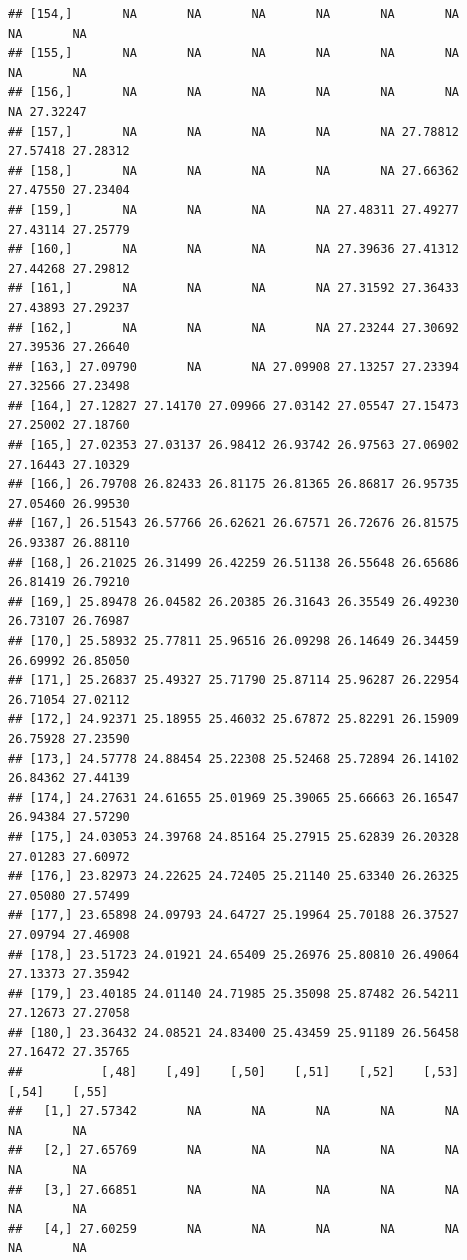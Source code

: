 \documentclass{article}\usepackage[]{graphicx}\usepackage[]{color}
\makeatletter
\newenvironment{kframe}{%
 \def\at@end@of@kframe{}%
 \ifinner\ifhmode%
  \def\at@end@of@kframe{\end{minipage}}%
  \begin{minipage}{\columnwidth}%
 \fi\fi%
 \def\FrameCommand##1{\hskip\@totalleftmargin \hskip-\fboxsep
 \colorbox{shadecolor}{##1}\hskip-\fboxsep
     \hskip-\linewidth \hskip-\@totalleftmargin \hskip\columnwidth}%
 \MakeFramed {\advance\hsize-\width
   \@totalleftmargin\z@ \linewidth\hsize
   \@setminipage}}%
 {\par\unskip\endMakeFramed%
 \at@end@of@kframe}
\newenvironment{knitrout}{}{} %
\makeatother
\begin{document}
\begin{knitrout}
\begin{kframe}
\begin{verbatim}
## [154,]       NA       NA       NA       NA       NA       NA       NA       NA
## [155,]       NA       NA       NA       NA       NA       NA       NA       NA
## [156,]       NA       NA       NA       NA       NA       NA       NA 27.32247
## [157,]       NA       NA       NA       NA       NA 27.78812 27.57418 27.28312
## [158,]       NA       NA       NA       NA       NA 27.66362 27.47550 27.23404
## [159,]       NA       NA       NA       NA 27.48311 27.49277 27.43114 27.25779
## [160,]       NA       NA       NA       NA 27.39636 27.41312 27.44268 27.29812
## [161,]       NA       NA       NA       NA 27.31592 27.36433 27.43893 27.29237
## [162,]       NA       NA       NA       NA 27.23244 27.30692 27.39536 27.26640
## [163,] 27.09790       NA       NA 27.09908 27.13257 27.23394 27.32566 27.23498
## [164,] 27.12827 27.14170 27.09966 27.03142 27.05547 27.15473 27.25002 27.18760
## [165,] 27.02353 27.03137 26.98412 26.93742 26.97563 27.06902 27.16443 27.10329
## [166,] 26.79708 26.82433 26.81175 26.81365 26.86817 26.95735 27.05460 26.99530
## [167,] 26.51543 26.57766 26.62621 26.67571 26.72676 26.81575 26.93387 26.88110
## [168,] 26.21025 26.31499 26.42259 26.51138 26.55648 26.65686 26.81419 26.79210
## [169,] 25.89478 26.04582 26.20385 26.31643 26.35549 26.49230 26.73107 26.76987
## [170,] 25.58932 25.77811 25.96516 26.09298 26.14649 26.34459 26.69992 26.85050
## [171,] 25.26837 25.49327 25.71790 25.87114 25.96287 26.22954 26.71054 27.02112
## [172,] 24.92371 25.18955 25.46032 25.67872 25.82291 26.15909 26.75928 27.23590
## [173,] 24.57778 24.88454 25.22308 25.52468 25.72894 26.14102 26.84362 27.44139
## [174,] 24.27631 24.61655 25.01969 25.39065 25.66663 26.16547 26.94384 27.57290
## [175,] 24.03053 24.39768 24.85164 25.27915 25.62839 26.20328 27.01283 27.60972
## [176,] 23.82973 24.22625 24.72405 25.21140 25.63340 26.26325 27.05080 27.57499
## [177,] 23.65898 24.09793 24.64727 25.19964 25.70188 26.37527 27.09794 27.46908
## [178,] 23.51723 24.01921 24.65409 25.26976 25.80810 26.49064 27.13373 27.35942
## [179,] 23.40185 24.01140 24.71985 25.35098 25.87482 26.54211 27.12673 27.27058
## [180,] 23.36432 24.08521 24.83400 25.43459 25.91189 26.56458 27.16472 27.35765
##           [,48]    [,49]    [,50]    [,51]    [,52]    [,53]    [,54]    [,55]
##   [1,] 27.57342       NA       NA       NA       NA       NA       NA       NA
##   [2,] 27.65769       NA       NA       NA       NA       NA       NA       NA
##   [3,] 27.66851       NA       NA       NA       NA       NA       NA       NA
##   [4,] 27.60259       NA       NA       NA       NA       NA       NA       NA

\end{verbatim}
\end{kframe}
\end{knitrout}
\end{document}

